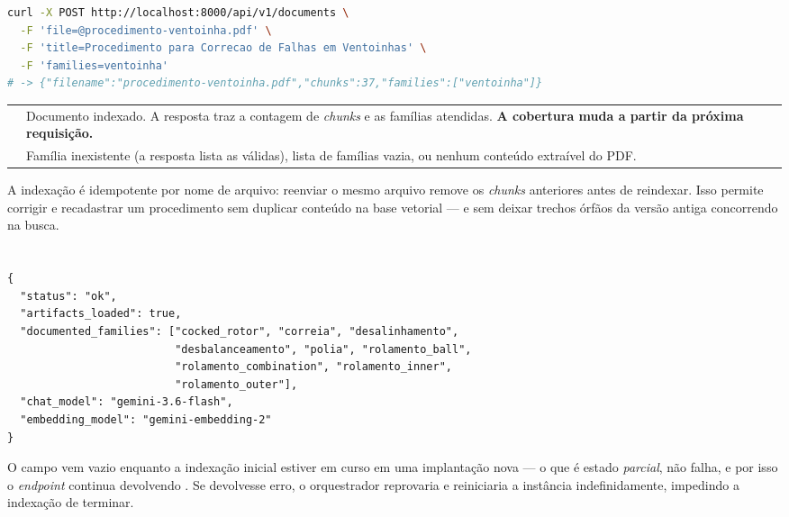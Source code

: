 \begin{lstlisting}[language=bash, caption={Cadastro de documento via linha de comando}, label={lst:upload}]
curl -X POST http://localhost:8000/api/v1/documents \
  -F 'file=@procedimento-ventoinha.pdf' \
  -F 'title=Procedimento para Correcao de Falhas em Ventoinhas' \
  -F 'families=ventoinha'
# -> {"filename":"procedimento-ventoinha.pdf","chunks":37,"families":["ventoinha"]}
\end{lstlisting}

\begin{tabularx}{\linewidth}{@{}L{16mm}X@{}}
\toprule
\headrow {} & \\
\midrule
{} & Documento indexado. A resposta traz a contagem de \textit{chunks} e
  as famílias atendidas. \textbf{A cobertura muda a partir da próxima
  requisição.}\\
\zebra \cd{422} & Família inexistente (a resposta lista as válidas), lista de
  famílias vazia, ou nenhum conteúdo extraível do PDF.\\
\bottomrule
\end{tabularx}

\begin{nota}
A indexação é idempotente por nome de arquivo: reenviar o mesmo arquivo remove
os \textit{chunks} anteriores antes de reindexar. Isso permite corrigir e
recadastrar um procedimento sem duplicar conteúdo na base vetorial --- e sem
deixar trechos órfãos da versão antiga concorrendo na busca.
\end{nota}

\section{}

\begin{lstlisting}[language=jsonpmx, caption={Resposta de saúde}, label={lst:health}]
{
  "status": "ok",
  "artifacts_loaded": true,
  "documented_families": ["cocked_rotor", "correia", "desalinhamento",
                          "desbalanceamento", "polia", "rolamento_ball",
                          "rolamento_combination", "rolamento_inner",
                          "rolamento_outer"],
  "chat_model": "gemini-3.6-flash",
  "embedding_model": "gemini-embedding-2"
}
\end{lstlisting}

O campo  vem vazio enquanto a indexação inicial estiver
em curso em uma implantação nova --- o que é estado \emph{parcial}, não falha, e
por isso o \textit{endpoint} continua devolvendo . Se devolvesse erro, o
orquestrador reprovaria e reiniciaria a instância indefinidamente, impedindo a
indexação de terminar.

